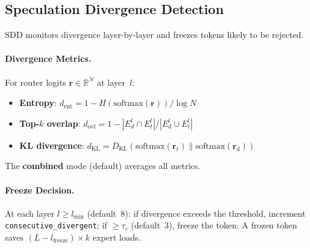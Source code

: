 \documentclass[letterpaper,twocolumn,10pt]{article}
\newcommand{\sdd}{SDD\xspace}
\begin{document}
\subsection{Speculation Divergence Detection}\label{sec:sdd}

\sdd monitors divergence layer-by-layer and freezes tokens likely to be
rejected.

\paragraph{Divergence Metrics.}  For router logits
$\mathbf{r}\!\in\!\mathbb{R}^N$ at layer~$l$:

\begin{itemize}[leftmargin=*,itemsep=1pt]
\item \textbf{Entropy}: $d_{\text{ent}} = 1 - H(\text{softmax}(\mathbf{r}))/\log N$
\item \textbf{Top-$k$ overlap}: $d_{\text{ovl}} = 1 - |E_d^l \cap E_t^l| / |E_d^l \cup E_t^l|$
\item \textbf{KL divergence}: $d_{\text{KL}} = D_{\text{KL}}(\text{softmax}(\mathbf{r}_t) \| \text{softmax}(\mathbf{r}_d))$
\end{itemize}

The \textbf{combined} mode (default) averages all metrics.

\paragraph{Freeze Decision.}  At each layer $l \geq l_{\min}$
(default~8): if divergence exceeds the threshold, increment
\texttt{consecutive\_divergent}; if $\geq \tau_c$ (default~3), freeze the
token.  A frozen token saves $(L - l_{\text{freeze}}) \times k$ expert
loads.
\end{document}
